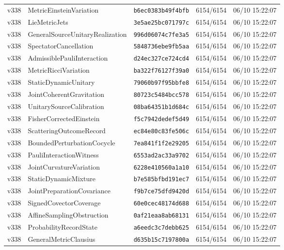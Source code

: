 \documentclass[11pt]{article}
\theoremstyle{definition}\newtheorem{deriv}{Derivation}
\begin{document}
{\begin{longtable}{@{}lllll@{}}
v338 & MetricEinsteinVariation & \texttt{b6ec0383b49f4bfb} & 6154/6154 & 06/10 15:22:07 \\
v338 & LieMetricJets & \texttt{3e5ae25bc071797c} & 6154/6154 & 06/10 15:22:07 \\
v338 & GeneralSourceUnitaryRealization & \texttt{996d06074c7fe3a5} & 6154/6154 & 06/10 15:22:07 \\
v338 & SpectatorCancellation & \texttt{5848736ebe9fb5aa} & 6154/6154 & 06/10 15:22:07 \\
v338 & AdmissiblePauliInteraction & \texttt{d24ec327ce724cd4} & 6154/6154 & 06/10 15:22:07 \\
v338 & MetricRicciVariation & \texttt{ba322f76127f39a0} & 6154/6154 & 06/10 15:22:07 \\
v338 & StaticDynamicUnitary & \texttt{79060b97f95bbfe8} & 6154/6154 & 06/10 15:22:07 \\
v338 & JointCoherentGravitation & \texttt{80723c5484bcc578} & 6154/6154 & 06/10 15:22:07 \\
v338 & UnitarySourceCalibration & \texttt{08ba64351b1d684c} & 6154/6154 & 06/10 15:22:07 \\
v338 & FisherCorrectedEinstein & \texttt{f5c7942dedef5d49} & 6154/6154 & 06/10 15:22:07 \\
v338 & ScatteringOutcomeRecord & \texttt{ec84e80c83fe506c} & 6154/6154 & 06/10 15:22:07 \\
v338 & BoundedPerturbationCocycle & \texttt{7ea841f1f2e29205} & 6154/6154 & 06/10 15:22:07 \\
v338 & PauliInteractionWitness & \texttt{6553ad2ac33a9702} & 6154/6154 & 06/10 15:22:07 \\
v338 & JointCurvatureVariation & \texttt{6228e410560a1a10} & 6154/6154 & 06/10 15:22:07 \\
v338 & StaticDynamicMixture & \texttt{b7e585bfbd191ec7} & 6154/6154 & 06/10 15:22:07 \\
v338 & JointPreparationCovariance & \texttt{f9b7ce75dfd9420d} & 6154/6154 & 06/10 15:22:07 \\
v338 & SignedCovectorCoverage & \texttt{60e0cec48174d688} & 6154/6154 & 06/10 15:22:07 \\
v338 & AffineSamplingObstruction & \texttt{0af21eaa8ab68131} & 6154/6154 & 06/10 15:22:07 \\
v338 & ProbabilityRecordState & \texttt{a6eedc3c7debb625} & 6154/6154 & 06/10 15:22:07 \\
v338 & GeneralMetricClausius & \texttt{d635b15c7197800a} & 6154/6154 & 06/10 15:22:07 \\

\end{longtable}}
\end{document}
